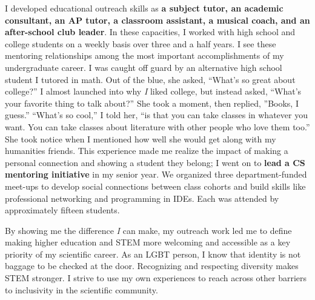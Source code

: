 \noindent
\underline{}
I developed educational outreach skills as \textbf{a subject tutor, an academic consultant, an AP tutor, a classroom assistant, a musical coach, and an after-school club leader}.
In these capacities, I worked with high school and college students on a weekly basis over three and a half years.
I see these mentoring relationships among the most important accomplishments of my undergraduate career.
I was caught off guard by an alternative high school student I tutored in math.
Out of the blue, she asked, ``What's so great about college?''
I almost launched into why \textit{I} liked college, but instead asked, ``What's your favorite thing to talk about?''
She took a moment, then replied, ''Books, I guess.''
``What's so cool,'' I told her, ``is that you can take classes in whatever you want.
You can take classes about literature with other people who love them too.''
She took notice when I mentioned how well she would get along with my humanities friends.
This experience made me realize the impact of making a personal connection and showing a student they belong;
I went on to \textbf{lead a CS mentoring initiative} in my senior year.
We organized three department-funded meet-ups to develop social connections between class cohorts and build skills like professional networking and programming in IDEs.
Each was attended by approximately fifteen students.

By showing me the difference \textit{I} can make, my outreach work
led me to define making higher education and STEM more welcoming and accessible as a key priority of my scientific career.
As an LGBT person, I know that identity is not baggage to be checked at the door.
Recognizing and respecting diversity makes STEM stronger.
I strive to use my own experiences to reach across other barriers to inclusivity in the scientific community.
